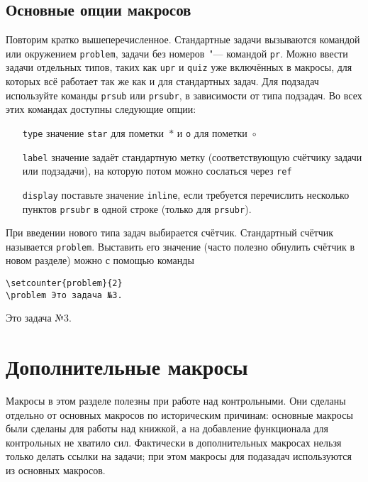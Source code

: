 \documentclass[12pt]{article}
\newcounter{problem}
\begin{document}
\subsection{Основные опции макросов}

Повторим кратко вышеперечисленное. Стандартные задачи вызываются командой или окружением \texttt{problem}, задачи без номеров~"--- командой \texttt{pr}. Можно ввести задачи отдельных типов, таких как \texttt{upr} и \texttt{quiz} уже включённых в макросы, для которых всё работает так же как и для стандартных задач. Для подзадач используйте команды \texttt{prsub} или \texttt{prsubr}, в зависимости от типа подзадач. Во всех этих командах доступны следующие опции:

\begin{itemize}
	\item[\texttt{type}] значение \texttt{star} для пометки~$*$ и \texttt{o} для пометки~$\circ$ 
	\item[\texttt{label}] значение задаёт стандартную метку (соответствующую счётчику задачи или подзадачи), на которую потом можно сослаться через \texttt{ref}
	\item[\texttt{display}] поставьте значение \texttt{inline}, если требуется перечислить несколько пунктов \texttt{prsubr} в одной строке (только для \texttt{prsubr}). 
\end{itemize}

При введении нового типа задач выбирается счётчик. Стандартный счётчик называется \texttt{problem}. Выставить его значение (часто полезно обнулить счётчик в новом разделе) можно с помощью команды

\begin{Verbatim}[frame=single]
\setcounter{problem}{2}
\problem Это задача №3.
\end{Verbatim}

\setcounter{problem}{2}
\problem Это задача №3.

\section{Дополнительные макросы}

Макросы в этом разделе полезны при работе над контрольными. Они сделаны отдельно от основных макросов по историческим причинам: основные макросы были сделаны для работы над книжкой, а на добавление функционала для контрольных не хватило сил. Фактически в дополнительных макросах нельзя только делать ссылки на задачи; при этом макросы для подазадач используются из основных макросов.
\end{document}
